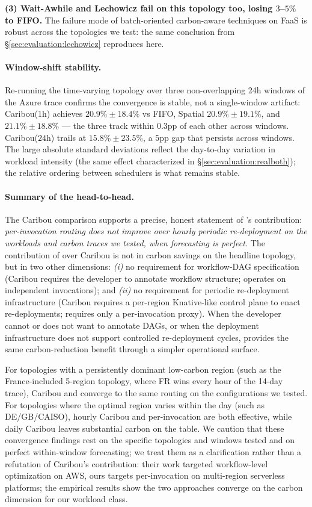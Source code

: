 \textbf{(3) Wait-Awhile and Lechowicz fail on this topology too,
losing $3$--$5\%$ to FIFO.} The failure mode of batch-oriented
carbon-aware techniques on FaaS is robust across the topologies
we test: the same conclusion from
\S\ref{sec:evaluation:lechowicz} reproduces here.

\paragraph{Window-shift stability.}
Re-running the time-varying topology over three non-overlapping 24h
windows of the Azure trace confirms the convergence is stable, not a
single-window artifact: Caribou($1$h) achieves $20.9\% \pm 18.4\%$
vs FIFO, Spatial $20.9\% \pm 19.1\%$, and \GreenFaaS{}
$21.1\% \pm 18.8\%$ --- the three track within $0.3$pp of each other
across windows. Caribou($24$h) trails at $15.8\% \pm 23.5\%$, a
$5$pp gap that persists across windows. The large absolute standard
deviations reflect the day-to-day variation in workload intensity
(the same effect characterized in \S\ref{sec:evaluation:realboth});
the relative ordering between schedulers is what remains stable.

\paragraph{Summary of the head-to-head.}
The Caribou comparison supports a precise, honest statement of
\GreenFaaS{}'s contribution: \emph{per-invocation routing does not
improve over hourly periodic re-deployment on the workloads and
carbon traces we tested, when forecasting is perfect.} The
contribution of \GreenFaaS{} over Caribou is not in carbon savings
on the headline topology, but in two other dimensions:
\emph{(i)} no requirement for workflow-DAG specification (Caribou
requires the developer to annotate workflow structure;
\GreenFaaS{} operates on independent invocations); and
\emph{(ii)} no requirement for periodic re-deployment infrastructure
(Caribou requires a per-region Knative-like control plane to enact
re-deployments; \GreenFaaS{} requires only a per-invocation
proxy). When the developer cannot or does not want to annotate
DAGs, or when the deployment infrastructure does not support
controlled re-deployment cycles, \GreenFaaS{} provides the same
carbon-reduction benefit through a simpler operational surface.

For topologies with a persistently dominant low-carbon region (such
as the France-included 5-region topology, where FR wins every hour of
the 14-day trace), Caribou and \GreenFaaS{} converge to the same
routing on the configurations we tested. For topologies where the
optimal region varies within the day (such as DE/GB/CAISO), hourly
Caribou and per-invocation \GreenFaaS{} are both effective, while
daily Caribou leaves substantial carbon on the table. We caution that
these convergence findings rest on the specific topologies and
windows tested and on perfect within-window forecasting; we treat
them as a clarification rather than a refutation of Caribou's
contribution: their work targeted workflow-level optimization on AWS,
ours targets per-invocation on multi-region serverless platforms; the
empirical results show the two approaches converge on the carbon
dimension for our workload class.
